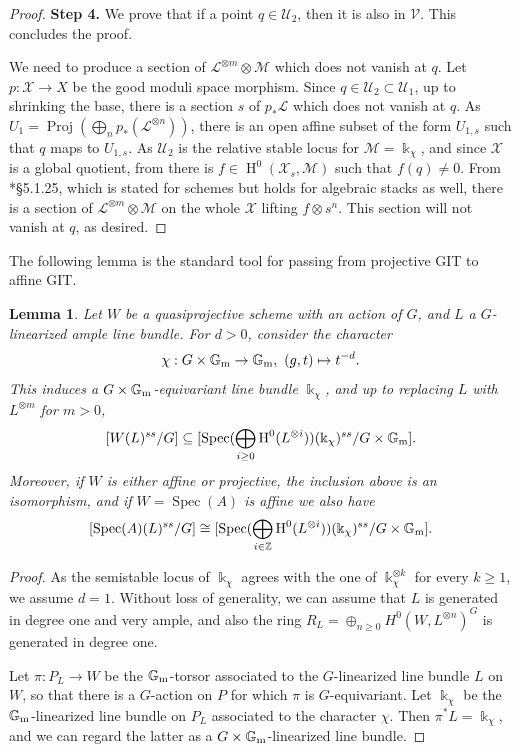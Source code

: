 \documentclass{amsart}
\newcommand{\bG}{\mathbb{G}}
\newcommand{\bZ}{\mathbb{Z}}
\newcommand{\oH}{\operatorname{H}}
\newcommand{\cL}{\mathcal{L}}
\newcommand{\cM}{\mathcal{M}}
\newcommand{\cU}{\mathcal{U}}
\newcommand{\cV}{\mathcal{V}}
\newcommand{\cX}{\mathcal{X}}
\newcommand{\spec}{\operatorname{Spec}}
\newcommand{\Proj}{\operatorname{Proj}}
\newcommand{\Gm}{\bG_{{\rm m}}}
\newtheorem{Lemma}[theorem]{Lemma}
\theoremstyle{definition}
\theoremstyle{definition}
\begin{document}
{\begin{proof}
    \noindent
    \textbf{Step 4.} We prove that if a point $q\in \cU_2$, then it is also in $\cV$. This concludes the proof.
    
    We need to produce a section of $\cL^{\otimes m}\otimes \cM$ which does not vanish at $q$. Let $p:\cX\to X$ be the good moduli space morphism. 
    Since $q\in \cU_2\subset\cU_1$, up to shrinking the base, there is a section $s$ of $p_*\cL$ which does not vanish at $q$. As $U_1=\Proj(\bigoplus_n p_*(\cL^{\otimes n}))$, there is an open affine subset of the form $U_{1,s}$ such that $q$ maps to $U_{1,s}$. 
    As $\cU_2$ is the relative stable locus for $\cM=\Bbbk_\chi$,
    and since $\cX$ is a global quotient, from  there is $f\in \oH^0(\cX_{s},\cM)$ such that $f(q)\neq 0$.
    From \cite{Liu_AG_book}*{\S 5.1.25}, which is stated for schemes but holds for algebraic stacks as well, there is a section of $\cL^{\otimes m}\otimes\cM$ on the whole $\cX$ lifting $f\otimes s^n$. This section will not vanish at $q$, as desired. 
 \end{proof}
 The following lemma is the standard tool for passing from projective GIT to affine GIT. \begin{Lemma}\label{lemma_git_for_ample_linearization_is_contained_in_the_affine_git_for_the_cone}
    Let $W$ be a quasiprojective scheme with an action of $G$, and $L$ a $G$-linearized ample line bundle. For $d>0$, consider the character \[\chi:G\times \Gm\to \Gm, \text{ }(g,t)\mapsto t^{-d}.\]
    This induces a $G\times \Gm$-equivariant line bundle $\Bbbk_\chi$, and up to replacing $L$ with $L^{\otimes m}$ for $m>0$,
    \[
    [W(L)^{ss}/G] \subseteq [\spec(\bigoplus_{i\ge 0} \oH^0(L^{\otimes i}))(\Bbbk_{\chi})^{ss}/G\times \Gm].
    \]
    Moreover, if $W$ is either affine or projective, the inclusion above is an isomorphism, and if $W=\spec(A)$ is affine we also have 
    \[
    [\spec(A)(L)^{ss}/G] \cong [\spec(\bigoplus_{i\in \bZ} \oH^0(L^{\otimes i}))(\Bbbk_{\chi})^{ss}/G\times \Gm].
    \]
\end{Lemma}
\begin{proof} As the semistable locus of $\Bbbk_\chi$ agrees with the one of $\Bbbk_\chi^{\otimes k}$ for every $k\ge 1$, we assume $d=1$.
    Without loss of generality, we can assume that $L$ is generated in degree one and very ample, and also the ring $R_L=\oplus_{n\geq 0} H^0(W,L^{\otimes n})^G$ is generated in degree one.
    
    Let $\pi:P_L\to W$ be the $\Gm$-torsor associated to the $G$-linearized line bundle $L$ on $W$, so that there is a $G$-action on $P$ for which $\pi$ is $G$-equivariant. Let $\Bbbk_\chi$ be the $\Gm$-linearized line bundle on $P_L$ associated to the character $\chi$. Then $\pi^*L=\Bbbk_\chi$, and we can regard the latter as a $G\times\Gm$-linearized line bundle. 
    

\end{proof}}
\end{document}
